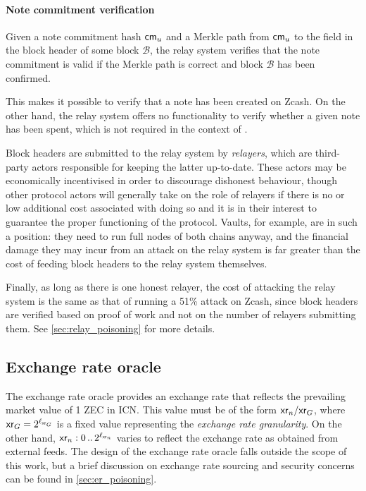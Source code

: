 \paragraph{Note commitment verification}
Given a note commitment hash $\mathsf{cm_{\mathnormal{u}}}$ and a Merkle path from $\mathsf{cm_{\mathnormal{u}}}$ to the \hfsr field in the block header of some block $\mathcal{B}$, the relay system verifies that the note commitment is valid if the Merkle path is correct and block $\mathcal{B}$ has been confirmed.

This makes it possible to verify that a note has been created on Zcash.
On the other hand, the relay system offers no functionality to verify whether a given note has been spent, which is not required in the context of \zclaim.

\medskip
Block headers are submitted to the relay system by \emph{relayers}, which are third-party actors responsible for keeping the latter up-to-date.
These actors may be economically incentivised in order to discourage dishonest behaviour, though other protocol actors will generally take on the role of relayers if there is no or low additional cost associated with doing so and it is in their interest to guarantee the proper functioning of the protocol.
Vaults, for example, are in such a position: they need to run full nodes of both chains anyway, and the financial damage they may incur from an attack on the relay system is far greater than the cost of feeding block headers to the relay system themselves.

Finally, as long as there is one honest relayer, the cost of attacking the relay system is the same as that of running a 51\% attack on Zcash, since block headers are verified based on proof of work and not on the number of relayers submitting them.
See \cref{sec:relay_poisoning} for more details.

\subsection{Exchange rate oracle}
The exchange rate oracle \oxr provides an exchange rate that reflects the prevailing market value of 1 ZEC in ICN.
This value \xr must be of the form $\mathsf{xr}_n/\mathsf{xr}_G$, where $\mathsf{xr}_G = 2^{\ell_{\mathsf{xr}_G}}$ is a fixed value representing the \emph{exchange rate granularity}.
On the other hand, $\mathsf{xr}_n : {0\,..\,2^{\ell_{\mathsf{xr}_n}}}$ varies to reflect the exchange rate as obtained from external feeds.
The design of the exchange rate oracle falls outside the scope of this work, but a brief discussion on exchange rate sourcing and security concerns can be found in \cref{sec:er_poisoning}.


